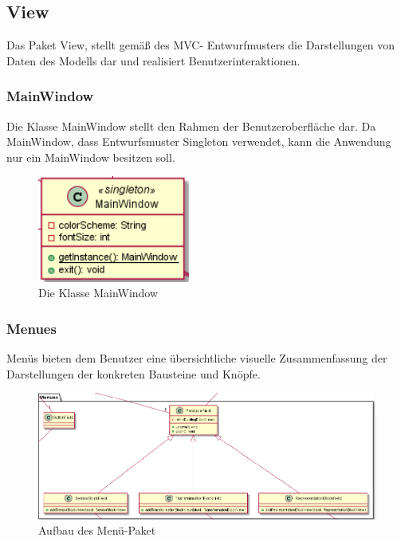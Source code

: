 \documentclass[parskip=full]{scrartcl}
\begin{document}
\clearpage
\subsection{View}
Das Paket View, stellt gemäß des MVC- Entwurfmusters die Darstellungen von Daten des Modells dar und realisiert Benutzerinteraktionen. 

\subsubsection{MainWindow} 
Die Klasse MainWindow stellt den Rahmen der Benutzeroberfläche dar. 
Da MainWindow, dass Entwurfsmuster Singleton verwendet, kann die Anwendung nur ein MainWindow besitzen soll.

\begin{figure}[htbp]
	\begin{center}
		\includegraphics[width = 5cm]{Grafiken/MainWindow.png}
		\caption{Die Klasse MainWindow}
		\label{Entwurf_Grob}
	\end{center}
\end{figure}

\newpage

\subsubsection{Menues}

Menüs bieten dem Benutzer eine übersichtliche visuelle Zusammenfassung der Darstellungen der konkreten Bausteine und Knöpfe. 

\begin{figure}[htbp]
	\begin{center}
		\includegraphics[width = 14cm]{Grafiken/MenuesNamespace.png}
		\caption{Aufbau des Menü-Paket}
		\label{Entwurf_Grob}
	\end{center}
\end{figure}
\end{document}
